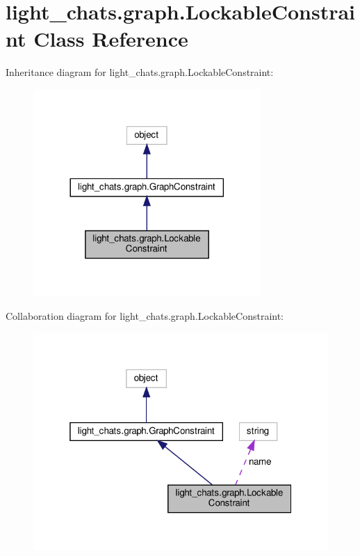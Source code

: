 \hypertarget{classlight__chats_1_1graph_1_1LockableConstraint}{}\section{light\+\_\+chats.\+graph.\+Lockable\+Constraint Class Reference}
\label{classlight__chats_1_1graph_1_1LockableConstraint}


Inheritance diagram for light\+\_\+chats.\+graph.\+Lockable\+Constraint\+:
\nopagebreak
\begin{figure}[H]
\begin{center}
\leavevmode
\includegraphics[width=245pt]{classlight__chats_1_1graph_1_1LockableConstraint__inherit__graph}
\end{center}
\end{figure}


Collaboration diagram for light\+\_\+chats.\+graph.\+Lockable\+Constraint\+:
\nopagebreak
\begin{figure}[H]
\begin{center}
\leavevmode
\includegraphics[width=319pt]{classlight__chats_1_1graph_1_1LockableConstraint__coll__graph}
\end{center}
\end{figure}
